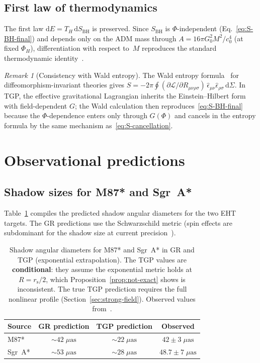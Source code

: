 \documentclass[11pt,a4paper]{article}
\theoremstyle{definition}
\theoremstyle{remark}
\newtheorem{remark}[theorem]{Remark}
\newcommand{\rs}{r_{\mathrm{s}}}
\newcommand{\dd}{\mathrm{d}}
\renewcommand{\Phi}{\varPhi}
\begin{document}
\subsection{First law of thermodynamics}

The first law $\dd E = T_H\,\dd S_{\mathrm{BH}}$ is preserved.  Since
$S_{\mathrm{BH}}$ is $\Phi$-independent (Eq.~\ref{eq:S-BH-final}) and
depends only on the ADM mass through $A = 16\pi G_0^2 M^2/c_0^4$
(at fixed $\Phi_H$), differentiation with respect to~$M$ reproduces the
standard thermodynamic identity~\cite{Bardeen1973}.

\begin{remark}[Consistency with Wald entropy]\label{rem:wald-entropy}
The Wald entropy formula~\cite{Wald1993} for diffeomorphism-invariant
theories gives $S = -2\pi\oint (\partial\mathcal{L}/\partial
R_{\mu\nu\rho\sigma})\,\hat{\epsilon}_{\mu\nu}\hat{\epsilon}_{\rho\sigma}
\,\dd\Sigma$.  In TGP, the effective gravitational Lagrangian inherits the
Einstein--Hilbert form with field-dependent $G$; the Wald calculation then
reproduces~\eqref{eq:S-BH-final} because the $\Phi$-dependence enters
only through $G(\Phi)$ and cancels in the entropy formula by the same
mechanism as~\eqref{eq:S-cancellation}.
\end{remark}

\section{Observational predictions}\label{sec:obs}

\subsection{Shadow sizes for M87* and Sgr~A*}

Table~\ref{tab:shadows} compiles the predicted shadow angular diameters
for the two EHT targets.  The GR predictions use the Schwarzschild
metric (spin effects are subdominant for the shadow size at current
precision~\cite{EHT-M87-VI}).

\begin{table}[h]
\centering
\caption{Shadow angular diameters for M87* and Sgr~A* in GR
  and TGP (exponential extrapolation).  The TGP values are
  \textbf{conditional}: they assume the exponential metric holds at
  $R = \rs/2$, which Proposition~\ref{prop:not-exact} shows is
  inconsistent.  The true TGP prediction requires the full nonlinear
  profile (Section~\ref{sec:strong-field}).
  Observed values from~\cite{EHT-M87-VI,EHT-SgrA-2022}.}
\label{tab:shadows}
\begin{tabular}{lccc}
\toprule
Source & GR prediction & TGP prediction & Observed \\
\midrule
M87*
  & $\sim 42\;\mu\mathrm{as}$
  & $\sim 22\;\mu\mathrm{as}$
  & $42 \pm 3\;\mu\mathrm{as}$ \\[3pt]
Sgr~A*
  & $\sim 53\;\mu\mathrm{as}$
  & $\sim 28\;\mu\mathrm{as}$
  & $48.7 \pm 7\;\mu\mathrm{as}$ \\
\bottomrule
\end{tabular}
\end{table}
\end{document}

